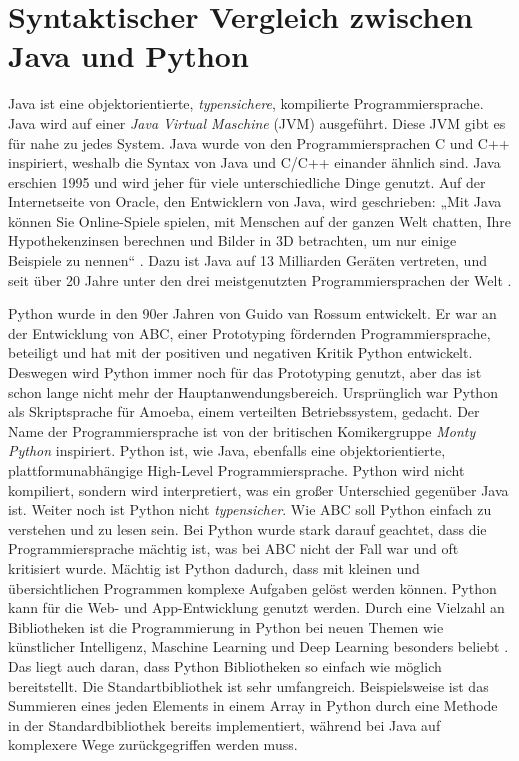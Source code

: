 \newcommand{\code}[1]{\texttt{#1}}

\chapter{Syntaktischer Vergleich zwischen Java und Python}
Java ist eine objektorientierte, \textit{typensichere}, kompilierte Programmiersprache. 
Java wird auf einer \textit{Java Virtual Maschine} (JVM) ausgeführt. 
Diese JVM gibt es für nahe zu jedes System. 
Java wurde von den Programmiersprachen C und C++ inspiriert, weshalb die Syntax von Java und C/C++ einander ähnlich sind. 
Java erschien 1995 und wird jeher für viele unterschiedliche Dinge genutzt. 
Auf der Internetseite von Oracle, den Entwicklern von Java, wird geschrieben: „Mit Java können Sie Online-Spiele spielen, mit Menschen auf der ganzen Welt chatten, Ihre Hypothekenzinsen berechnen und Bilder in 3D betrachten, um nur einige Beispiele zu nennen“ \cite{Oracle:Java}. 
Dazu ist Java auf 13 Milliarden Geräten vertreten, und seit über 20 Jahre unter den drei meistgenutzten Programmiersprachen der Welt \cite{Github:PYPL}. \cite{Louis:2010}\cite{Oracle:Twitter} 
\par
Python wurde in den 90er Jahren von Guido van Rossum entwickelt. 
Er war an der Entwicklung von ABC, einer Prototyping fördernden Programmiersprache, beteiligt und hat mit der positiven und negativen Kritik Python entwickelt. 
Deswegen wird Python immer noch für das Prototyping genutzt, aber das ist schon lange nicht mehr der Hauptanwendungsbereich. 
Ursprünglich war Python als Skriptsprache für Amoeba, einem verteilten Betriebssystem, gedacht. 
Der Name der Programmiersprache ist von der britischen Komikergruppe \textit{Monty Python} inspiriert. 
Python ist, wie Java, ebenfalls eine objektorientierte, plattformunabhängige High-Level Programmiersprache. 
Python wird nicht kompiliert, sondern wird interpretiert, was ein großer Unterschied gegenüber Java ist. 
Weiter noch ist Python nicht \textit{typensicher}. 
Wie ABC soll Python einfach zu verstehen und zu lesen sein. 
Bei Python wurde stark darauf geachtet, dass die Programmiersprache mächtig ist, was bei ABC nicht der Fall war und oft kritisiert wurde. 
Mächtig ist Python dadurch, dass mit kleinen und übersichtlichen Programmen komplexe Aufgaben gelöst werden können. 
Python kann für die Web- und App-Entwicklung genutzt werden. 
Durch eine Vielzahl an Bibliotheken ist die Programmierung in Python bei neuen Themen wie künstlicher Intelligenz, Maschine Learning und Deep Learning besonders beliebt \cite{PythonCS}. 
Das liegt auch daran, dass Python Bibliotheken so einfach wie möglich bereitstellt. 
Die Standartbibliothek ist sehr umfangreich. 
Beispielsweise ist das Summieren eines jeden Elements in einem Array in Python durch eine Methode in der Standardbibliothek bereits implementiert, während bei Java auf komplexere Wege zurückgegriffen werden muss. \cite{Python3:Buch}

